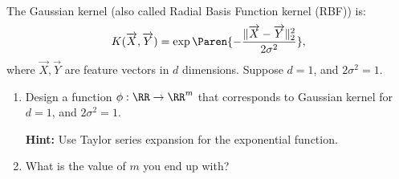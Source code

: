 \documentclass[11pt]{article}
\newenvironment{problem}[2][Problem]{\begin{trivlist}
\item[\hskip \labelsep {\bfseries #1}\hskip \labelsep {\bfseries #2.}]}{\end{trivlist}}
\begin{document}
\begin{problem}{1. (15 points)}
\begin{center}
\end{center}

\end{problem}

\begin{problem}{2. (10 points)}
The Gaussian kernel (also called Radial Basis Function kernel (RBF)) is:
\[
K(\overrightarrow X, \overrightarrow Y) = \exp\Paren{-\frac{\|\overrightarrow X-\overrightarrow Y\|_2^2}{2\sigma^2}},
\]
where $\overrightarrow X, \overrightarrow Y$ are feature vectors in $d$ dimensions.
Suppose $d=1$, and $2\sigma^2=1$. 
\begin{enumerate}
\item Design a function $\phi:\RR\to \RR^m$ that corresponds to Gaussian kernel for $d=1$, and $2\sigma^2=1$. 

\textbf{Hint:} Use Taylor series expansion for the exponential function. 
\item What is the value of $m$ you end up with?
\end{enumerate}
\end{problem}
\end{document}
